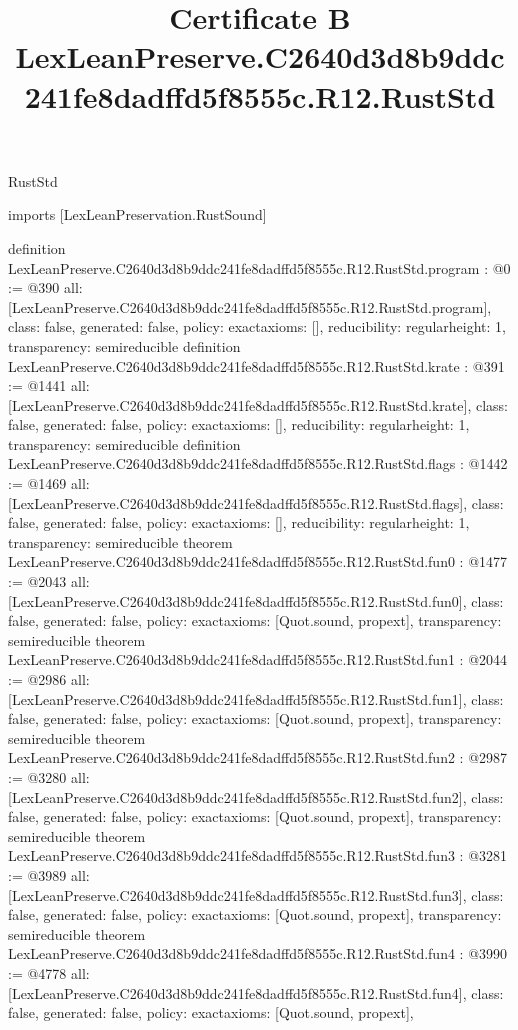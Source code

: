 \begin{lexlean}{RustStd}
\title{Certificate B LexLeanPreserve.C2640d3d8b9ddc241fe8dadffd5f8555c.R12.RustStd}
\begin{coremodule}
imports [LexLeanPreservation.RustSound]

definition LexLeanPreserve.C2640d3d8b9ddc241fe8dadffd5f8555c.R12.RustStd.program : @0 := @390 {
  all: [LexLeanPreserve.C2640d3d8b9ddc241fe8dadffd5f8555c.R12.RustStd.program],
  class: false,
  generated: false,
  policy: exact{axioms: []},
  reducibility: regular{height: 1},
  transparency: semireducible
}
definition LexLeanPreserve.C2640d3d8b9ddc241fe8dadffd5f8555c.R12.RustStd.krate : @391 := @1441 {
  all: [LexLeanPreserve.C2640d3d8b9ddc241fe8dadffd5f8555c.R12.RustStd.krate],
  class: false,
  generated: false,
  policy: exact{axioms: []},
  reducibility: regular{height: 1},
  transparency: semireducible
}
definition LexLeanPreserve.C2640d3d8b9ddc241fe8dadffd5f8555c.R12.RustStd.flags : @1442 := @1469 {
  all: [LexLeanPreserve.C2640d3d8b9ddc241fe8dadffd5f8555c.R12.RustStd.flags],
  class: false,
  generated: false,
  policy: exact{axioms: []},
  reducibility: regular{height: 1},
  transparency: semireducible
}
theorem LexLeanPreserve.C2640d3d8b9ddc241fe8dadffd5f8555c.R12.RustStd.fun0 : @1477 := @2043 {
  all: [LexLeanPreserve.C2640d3d8b9ddc241fe8dadffd5f8555c.R12.RustStd.fun0],
  class: false,
  generated: false,
  policy: exact{axioms: [Quot.sound, propext]},
  transparency: semireducible
}
theorem LexLeanPreserve.C2640d3d8b9ddc241fe8dadffd5f8555c.R12.RustStd.fun1 : @2044 := @2986 {
  all: [LexLeanPreserve.C2640d3d8b9ddc241fe8dadffd5f8555c.R12.RustStd.fun1],
  class: false,
  generated: false,
  policy: exact{axioms: [Quot.sound, propext]},
  transparency: semireducible
}
theorem LexLeanPreserve.C2640d3d8b9ddc241fe8dadffd5f8555c.R12.RustStd.fun2 : @2987 := @3280 {
  all: [LexLeanPreserve.C2640d3d8b9ddc241fe8dadffd5f8555c.R12.RustStd.fun2],
  class: false,
  generated: false,
  policy: exact{axioms: [Quot.sound, propext]},
  transparency: semireducible
}
theorem LexLeanPreserve.C2640d3d8b9ddc241fe8dadffd5f8555c.R12.RustStd.fun3 : @3281 := @3989 {
  all: [LexLeanPreserve.C2640d3d8b9ddc241fe8dadffd5f8555c.R12.RustStd.fun3],
  class: false,
  generated: false,
  policy: exact{axioms: [Quot.sound, propext]},
  transparency: semireducible
}
theorem LexLeanPreserve.C2640d3d8b9ddc241fe8dadffd5f8555c.R12.RustStd.fun4 : @3990 := @4778 {
  all: [LexLeanPreserve.C2640d3d8b9ddc241fe8dadffd5f8555c.R12.RustStd.fun4],
  class: false,
  generated: false,
  policy: exact{axioms: [Quot.sound, propext]},
}
\end{coremodule}
\end{lexlean}
